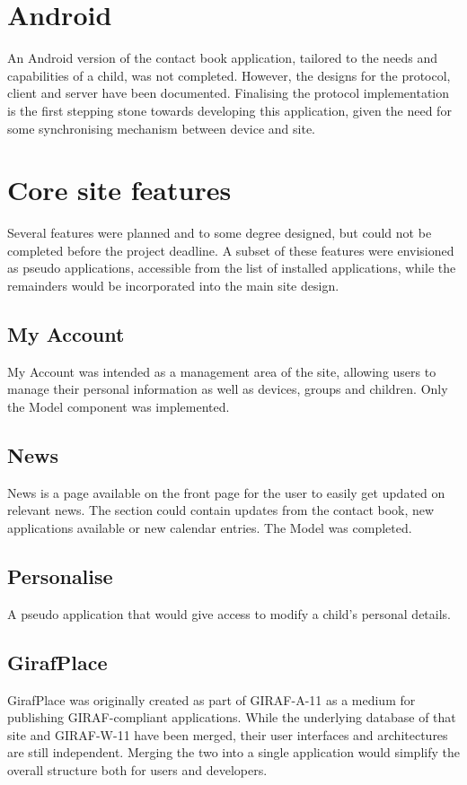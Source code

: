 \section{Android}
%
\label{androidReflection}
An Android version of the contact book application, tailored to the needs and capabilities of a child, was not completed. However, the designs for the protocol, client and server have been documented. Finalising the protocol implementation is the first stepping stone towards developing this application, given the need for some synchronising mechanism between device and site.

\section{Core site features}
Several features were planned and to some degree designed, but could not be completed before the project deadline. A subset of these features were envisioned as pseudo applications, accessible from the list of installed applications, while the remainders would be incorporated into the main site design.

\subsection*{My Account}
My Account was intended as a management area of the site, allowing users to manage their personal information as well as devices, groups and children. Only the Model component was implemented.

\subsection*{News}
News is a page available on the front page for the user to easily get updated on relevant news. The section could contain updates from the contact book, new applications available or new calendar entries. The Model was completed.

\subsection*{Personalise}
A pseudo application that would give access to modify a child's personal details.

\subsection*{GirafPlace}
GirafPlace was originally created as part of GIRAF-A-11 as a medium for publishing GIRAF-compliant applications. While the underlying database of that site and GIRAF-W-11 have been merged, their user interfaces and architectures are still independent. Merging the two into a single application would simplify the overall structure both for users and developers.

